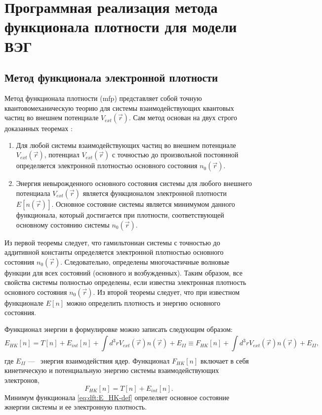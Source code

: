 
\chapter{Программная реализация метода функционала плотности для модели ВЭГ}

\section{Метод функционала электронной плотности}
Метод функционала плотности (\acrshort{mfp}) представляет собой точную\\ квантовомеханическую теорию для системы взаимодействующих квантовых частиц во внешнем потенциале $V_{ext} (\vec{r})$.
Сам метод основан на двух строго доказанных теоремах \cite{hohenberg:dft}:
\begin{enumerate}
    \item Для любой системы взаимодействующих частиц во внешнем потенциале $V_{ext} (\vec{r})$, потенциал $V_{ext} (\vec{r})$ с точностью до произвольной постоянной определяется электронной плотностью основного состояния $n_0 (\vec{r})$.
    \item Энергия невырожденного основного состояния системы для любого внешнего потенциала $V_{ext} (\vec{r})$ является функционалом электронной плотности $E[n(\vec{r})]$. Основное состояние системы является минимумом данного функционала, который достигается при плотности, соответствующей основному состоянию системы $n_0 (\vec{r})$.
\end{enumerate}

Из первой теоремы следует, что гамильтониан системы с точностью до аддитивной константы определяется электронной плотностью основного состояния $n_0 (\vec{r})$.
Следовательно, определены многочастичные волновые функции для всех состояний (основного и возбужденных).
Таким образом, все свойства системы полностью определены, если известна электронная плотность основного состояния $n_0 (\vec{r})$.
Из второй теоремы следует, что при известном функционале $E[n]$ можно определить плотность и энергию основного состояния.

Функционал энергии в формулировке \cite{hohenberg:dft} можно записать следующим образом:
\begin{equation}
    \label{eq:dft:E_HK-def}
    E_{HK} [n] = T[n] + E_{int} [n] + \int\limits_{}^{} d^3 r V_{ext} (\vec{r}) n(\vec{r}) + E_{II} 
    \equiv F_{HK} [n] + \int\limits_{}^{}d^3 r V_{ext} (\vec{r}) n(\vec{r}) + E_{II},
\end{equation}
где $E_{II} $ ---~ энергия взаимодействия ядер. Функционал $F_{HK} [n]$ включает в себя кинетическую и потенциальную энергию системы взаимодействующих электронов,
\begin{equation}
    \label{eq:dft:F_HK-def}
    F_{HK} [n] = T[n] + E_{i n t} [n]. 
\end{equation}
Минимум функционала \eqref{eq:dft:E_HK-def} опрелеляет основное состояние жнергии системы и ее электронную плотность.

